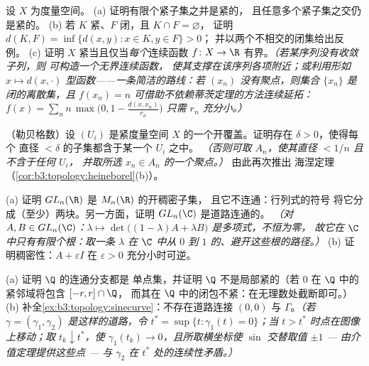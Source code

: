 \begin{exercise}[$\star\star$]\label{exo:b3:topology:6}
设 $X$ 为度量空间。
(a) 证明有限个紧子集之并是紧的，
且任意多个紧子集之交仍是紧的。
(b) 若 $K$ 紧、$F$ 闭，且 $K \cap F = \varnothing$，
证明 $d(K, F) = \inf\{d(x,y) : x \in K, y \in F\} > 0$；
并以两个不相交的闭集给出反例。
(c) 证明 $X$ 紧当且仅当\emph{每个}连续函数 $f
\colon X \to \R$ 有界。\emph{（若某序列没有收敛子列，则
可构造一个无界连续函数，
使其支撑在该序列各项附近；或利用形如 $x \mapsto
d(x, \cdot)$ 型函数——一条简洁的路线：若 $(x_n)$
没有聚点，则集合 $\{x_n\}$ 是闭的离散集，且
$f(x_n) = n$ 可借助不依赖蒂茨定理的方法连续延拓：
$f(x) = \sum_n n\,\max\bigl(0, 1 - \frac{d(x, x_n)}{r_n}\bigr)$
只需 $r_n$ 充分小。）}
\end{exercise}

\begin{exercise}[$\star\star$]\label{exo:b3:topology:7}
（勒贝格数）设 $(U_i)$ 是紧度量空间
$X$ 的一个开覆盖。证明存在 $\delta > 0$，使得每个
直径 $< \delta$ 的子集都含于某一个 $U_i$ 之中。
\emph{（否则可取 $A_n$，使其直径 $< 1/n$ 且不含于任何 $U_i$，
并取所选 $x_n \in A_n$ 的一个聚点。）} 由此再次推出
海涅定理（\cref{cor:b3:topology:heineborel}(b)）。
\end{exercise}

\begin{exercise}[$\star\star$]\label{exo:b3:topology:8}
(a) 证明 $GL_n(\R)$ 是 $M_n(\R)$ 的开稠密子集，
且它不连通：行列式的符号
将它分成（至少）两块。另一方面，证明
$GL_n(\C)$ 是道路连通的。
\emph{（对 $A, B \in GL_n(\C)$：$\lambda \mapsto \det\bigl((1 -
\lambda)A + \lambda B\bigr)$ 是多项式，不恒为零，
故它在 $\C$ 中只有有限个根：取一条
$\lambda$ 在 $\C$ 中从 $0$ 到 $1$ 的、避开这些根的路径。）}
(b) 证明稠密性：$A + \varepsilon I$ 在
$\varepsilon > 0$ 充分小时可逆。
\end{exercise}

\begin{exercise}[$\star\star$]\label{exo:b3:topology:9}
(a) 证明 $\Q$ 的连通分支都是
单点集，并证明 $\Q$ 不是局部紧的（若
$0$ 在 $\Q$ 中的紧邻域将包含 $[-r, r]\cap\Q$，
而其在 $\Q$ 中的闭包不紧：在无理数处截断即可。）
(b) 补全\cref{ex:b3:topology:sinecurve}：不存在道路连接
$(0,0)$ 与 $\Gamma$。\emph{（若 $\gamma = (\gamma_1, \gamma_2)$
是这样的道路，令 $t^* = \sup\{t : \gamma_1(t) = 0\}$；当 $t
> t^*$ 时点在图像上移动；取 $t_k \downarrow
t^*$，使 $\gamma_1(t_k) \to 0$，且所取横坐标使 $\sin$
交替取值 $\pm1$ --- 由介值定理提供这些点 ---
与 $\gamma_2$ 在
$t^*$ 处的连续性矛盾。）}
\end{exercise}

